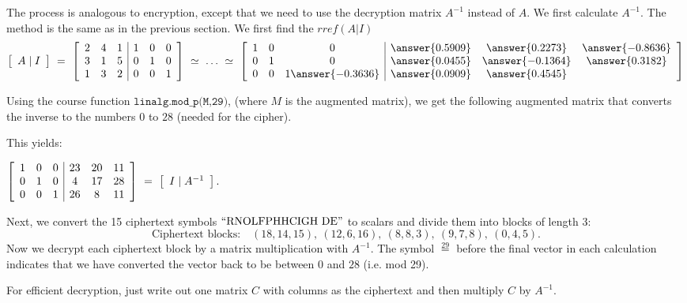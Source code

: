 \documentclass{ximera}
\begin{document}
\begin{solution}
  The process is analogous to encryption, except that we need to use
  the decryption matrix $A^{-1}$ instead of $A$. We first calculate
  $A^{-1}$.
  The method is the same as in the previous section. We first find the $rref(A|I)$
  \begin{equation*}
    \startmat{c}A\mid I\stopmat
    ~=~
    \startmat{ccc|ccc}
      2 & 4 & 1  &  1 & 0 & 0 \\
      3 & 1 & 5  &  0 & 1 & 0 \\
      1 & 3 & 2  &  0 & 0 & 1 \\
    \stopmat
    ~\simeq~\ldots~\simeq~
    \startmat{ccc|ccc}
    1 & 0 & 0  & \answer{0.5909} & \answer{0.2273} & \answer{-0.8636} \\
    0 & 1 & 0  &   \answer{0.0455} & \answer{-0.1364} & \answer{0.3182} \\
    0 & 0 & 1  \answer{-0.3636} & \answer{0.0909} & \answer{0.4545}
    \stopmat
  \end{equation*}

  Using the course function $\texttt{linalg.mod\_p(M,29)}$, (where $M$ is the augmented matrix), we get the following augmented matrix that converts the inverse to the numbers $0$ to $28$ (needed for the cipher).

  This yields:

  $\startmat{ccc|ccc}
      1 & 0 & 0  &  23 & 20 & 11 \\
      0 & 1 & 0  &   4 & 17 & 28 \\
      0 & 0 & 1  &  26 &  8 & 11 \\
    \stopmat
    ~=~
    \startmat{c}I\mid A^{-1}\stopmat.$

  Next, we convert the 15 ciphertext symbols $\q{RNOLFPHHCIGH DE}$ to
  scalars and divide them into blocks of length 3:
  \begin{equation*}
    \mbox{Ciphertext blocks:}\quad
    (18,14,15),\
    (12,6,16),\
    (8,8,3),\
    (9,7,8),\
    (0,4,5).
  \end{equation*}
  Now we decrypt each ciphertext block by a matrix multiplication
  with $A^{-1}$. The symbol $\stackrel{29}{=}$ before the final vector in each calculation indicates that we have converted the vector back to be between $0$ and $28$ (i.e. mod 29).

  \begin{hint}
    For efficient decryption, just write out one matrix $C$ with columns as the ciphertext and then multiply $C$ by $A^{-1}$. 
  \end{hint}


\end{solution}
\end{document}
